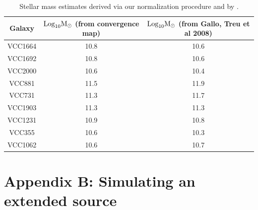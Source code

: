 \begin{table}
	\centering
	\label{table:stellar_mass}
	\caption[Inferred stellar masses]{Stellar mass estimates derived via our normalization procedure and by \cite{Gallo++08}.}
	\begin{tabular}{c c c}
		\hline
		Galaxy & $\rm{Log}_{10} M_{\odot}$ (from convergence map) & $\rm{Log}_{10} M_{\odot}$ (from Gallo, Treu et al 2008)\\
		\hline
		VCC1664 & 10.8 & 10.6 \\
		VCC1692 & 10.8 & 10.6 \\
		VCC2000 & 10.6 & 10.4 \\
		VCC881 & 11.5 & 11.9 \\
		VCC731 & 11.3 & 11.7 \\
		VCC1903 & 11.3 & 11.3 \\ 
		VCC1231 & 10.9 & 10.8 \\ 
		VCC355 & 10.6 & 10.3 \\
		VCC1062 & 10.6 & 10.7 \\
		\hline 
	\end{tabular}
\end{table}

\section{Appendix B: Simulating an extended source}
\label{app:B}

